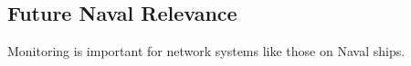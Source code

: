 \subsection{Future Naval Relevance}
\label{sec:naval}

Monitoring is important for network systems like those on Naval ships.
